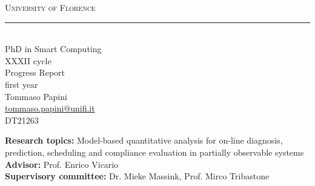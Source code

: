 
\begin{titlepage}
  \begin{center}
    {\scshape
      {\huge University of Florence}\\
      \rule{0.9\textwidth}{1.5pt}\\[0.5cm]
      {\Large PhD in Smart Computing}\\
      {\large XXXII cycle}\\[3cm]
      {\huge Progress Report}\\
      {\large first year}\\[3cm]
      {\Large Tommaso Papini}\\
      {\upshape \href{mailto:tommaso.papini@unifi.it}{tommaso.papini@unifi.it}}\\
      DT21263
    }
  \end{center}
  
  \vfill
  
  \noindent
  \textbf{Research topics:} Model-based quantitative analysis for on-line diagnosis, prediction, scheduling and compliance evaluation in partially observable systems\\
  \textbf{Advisor:} Prof. Enrico Vicario\\
  \textbf{Supervisory committee:} Dr. Mieke Massink, Prof. Mirco Tribastone
\end{titlepage}
